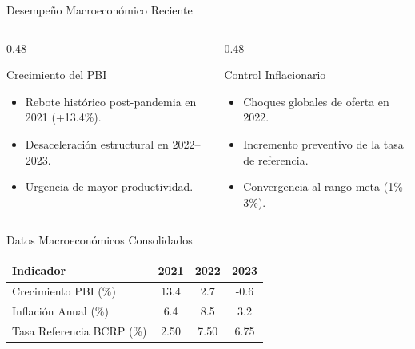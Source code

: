 \documentclass[10pt]{beamer}
\begin{document}
\begin{frame}{Desempeño Macroeconómico Reciente}
  \begin{columns}[t]
    \begin{column}{0.48\textwidth}
      \begin{block}{Crecimiento del PBI}
        \begin{itemize}
          \item Rebote histórico post-pandemia en 2021 (+13.4\%).
          \item Desaceleración estructural en 2022--2023.
          \item Urgencia de mayor productividad.
        \end{itemize}
      \end{block}
    \end{column}

    \begin{column}{0.48\textwidth}
      \begin{alertblock}{Control Inflacionario}
        \begin{itemize}
          \item Choques globales de oferta en 2022.
          \item Incremento preventivo de la tasa de referencia.
          \item Convergencia al rango meta (1\%--3\%).
        \end{itemize}
      \end{alertblock}
    \end{column}
  \end{columns}
\end{frame}

\begin{frame}{Datos Macroeconómicos Consolidados}
  \centering
  \small
  \begin{tabular}{lccc}
    \toprule
    \textbf{Indicador} & \textbf{2021} & \textbf{2022} & \textbf{2023} \\
    \midrule
    Crecimiento PBI (\%) & 13.4 & 2.7 & -0.6 \\
    Inflación Anual (\%) & 6.4 & 8.5 & 3.2 \\
    Tasa Referencia BCRP (\%) & 2.50 & 7.50 & 6.75 \\
    \bottomrule
  \end{tabular}
\end{frame}
\end{document}
